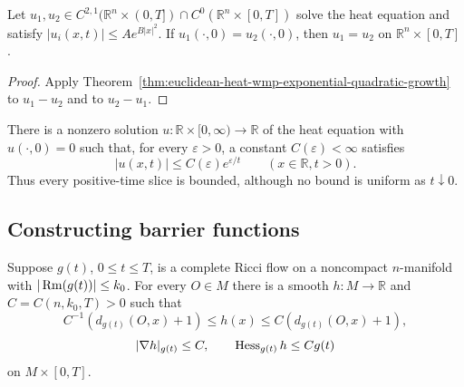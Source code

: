 \begin{theorem}
\label{thm:euclidean-heat-uniqueness-exponential-quadratic-growth}

Let $u_1,u_2\in C^{2,1}(\mathbb R^n\times(0,T])\cap
C^0(\mathbb R^n\times[0,T])$ solve the heat equation and satisfy
$|u_i(x,t)|\leq Ae^{B|x|^2}$.  If $u_1(\cdot,0)=u_2(\cdot,0)$, then
$u_1=u_2$ on $\mathbb R^n\times[0,T]$.
\end{theorem}

\begin{proof}
\sketch
{}
Apply Theorem~\ref{thm:euclidean-heat-wmp-exponential-quadratic-growth} to
$u_1-u_2$ and to $u_2-u_1$.
\end{proof}

\begin{theorem}
\label{thm:heat-nonuniqueness-slicewise-bounded}

There is a nonzero solution $u:\mathbb R\times[0,\infty)\to\mathbb R$ of the
heat equation with $u(\cdot,0)=0$ such that, for every $\varepsilon>0$, a
constant $C(\varepsilon)<\infty$ satisfies
\[
|u(x,t)|\leq C(\varepsilon)e^{\varepsilon/t}
\qquad(x\in\mathbb R, t>0).
\]
Thus every positive-time slice is bounded, although no bound is uniform as
$t\downarrow0$.
\end{theorem}

\subsection{Constructing barrier functions}

\begin{lemma}
\label{lem:ricci-flow-distance-like-function}

Suppose $g(t)$, $0\leq t\leq T$, is a complete Ricci flow on a noncompact
$n$-manifold with $|\operatorname{Rm}(g(t))|\leq k_0$.  For every $O\in M$ there is a smooth
$h:M\to\mathbb R$ and $C=C(n,k_0,T)>0$ such that
\[
C^{-1}(d_{g(t)}(O,x)+1)\leq h(x)\leq C(d_{g(t)}(O,x)+1),
\]
\[
|\nabla h|_{g(t)}\leq C,\qquad \operatorname{Hess}_{g(t)}h\leq Cg(t)
\]
on $M\times[0,T]$.
\end{lemma}

